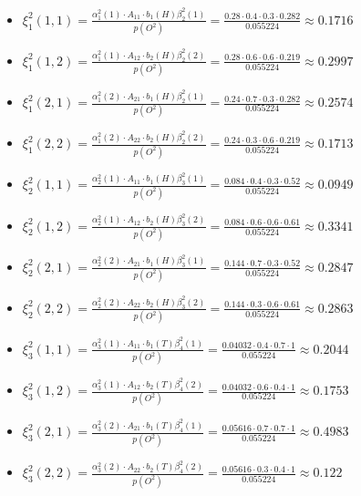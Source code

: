 \documentclass[11pt,a4paper]{article}
\begin{document}
	\begin{itemize}
		\item $ \xi_1^2(1, 1) = \frac{\alpha_1^2(1) \cdot A_{11} \cdot b_1(H) \beta_{2}^2(1)}{p(O^2)} =  \frac{0.28 \cdot 0.4 \cdot 0.3 \cdot 0.282}{0.055224} \approx 0.1716 $
		\item $ \xi_1^2(1, 2) = \frac{\alpha_1^2(1) \cdot A_{12} \cdot b_2(H) \beta_{2}^2(2)}{p(O^2)} =  \frac{0.28 \cdot 0.6 \cdot 0.6 \cdot 0.219}{0.055224} \approx 0.2997 $
		\item $ \xi_1^2(2, 1) = \frac{\alpha_1^2(2) \cdot A_{21} \cdot b_1(H) \beta_{2}^2(1)}{p(O^2)} =  \frac{0.24 \cdot 0.7 \cdot 0.3 \cdot 0.282}{0.055224} \approx 0.2574 $
		\item $ \xi_1^2(2, 2) = \frac{\alpha_1^2(2) \cdot A_{22} \cdot b_2(H) \beta_{2}^2(2)}{p(O^2)} =  \frac{0.24 \cdot 0.3 \cdot 0.6 \cdot 0.219}{0.055224}\approx 0.1713 $
		\item $ \xi_2^2(1, 1) = \frac{\alpha_2^2(1) \cdot A_{11} \cdot b_1(H) \beta_{3}^2(1)}{p(O^2)}=  \frac{0.084 \cdot 0.4 \cdot 0.3 \cdot 0.52}{0.055224} \approx 0.0949 $
		\item $ \xi_2^2(1, 2) = \frac{\alpha_2^2(1) \cdot A_{12} \cdot b_2(H) \beta_{3}^2(2)}{p(O^2)} =  \frac{0.084 \cdot 0.6 \cdot 0.6 \cdot 0.61}{0.055224} \approx 0.3341 $
		\item $ \xi_2^2(2, 1) = \frac{\alpha_2^2(2) \cdot A_{21} \cdot b_1(H) \beta_{3}^2(1)}{p(O^2)} =  \frac{0.144 \cdot 0.7 \cdot 0.3 \cdot 0.52}{0.055224} \approx 0.2847 $
		\item $ \xi_2^2(2, 2) = \frac{\alpha_2^2(2) \cdot A_{22} \cdot b_2(H) \beta_{3}^2(2)}{p(O^2)}=  \frac{0.144 \cdot 0.3 \cdot 0.6 \cdot 0.61}{0.055224} \approx 0.2863 $
		\item $ \xi_3^2(1, 1) = \frac{\alpha_3^2(1) \cdot A_{11} \cdot b_1(T) \beta_{4}^2(1)}{p(O^2)} =  \frac{0.04032 \cdot 0.4 \cdot 0.7 \cdot 1}{0.055224} \approx 0.2044 $
		\item $ \xi_3^2(1, 2) = \frac{\alpha_3^2(1) \cdot A_{12} \cdot b_2(T) \beta_{4}^2(2)}{p(O^2)} =  \frac{0.04032 \cdot 0.6 \cdot 0.4 \cdot 1}{0.055224} \approx 0.1753 $
		\item $ \xi_3^2(2, 1) = \frac{\alpha_3^2(2) \cdot A_{21} \cdot b_1(T) \beta_{4}^2(1)}{p(O^2)} =  \frac{0.05616 \cdot 0.7 \cdot 0.7 \cdot 1}{0.055224} \approx 0.4983 $
		\item $ \xi_3^2(2, 2) = \frac{\alpha_3^2(2) \cdot A_{22} \cdot b_2(T) \beta_{4}^2(2)}{p(O^2)}=  \frac{0.05616 \cdot 0.3 \cdot 0.4 \cdot 1}{0.055224} \approx 0.122 $
	\end{itemize}
	
\end{document}

